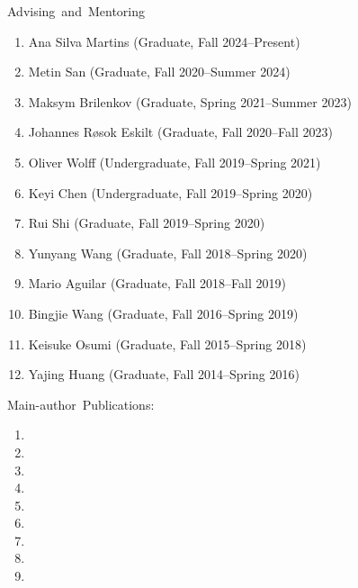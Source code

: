 \documentclass[a4paper]{resume}
\begin{document}
\begin{category}{\mbox{Advising and Mentoring}}
    \citemnobullet
    \noindent
    \begin{enumerate}[topsep=0pt,itemsep=0pt,partopsep=0pt,parsep=0pt]
        \item Ana Silva Martins (Graduate, Fall 2024--Present)
        \item Metin San (Graduate, Fall 2020--Summer 2024)
        \item Maksym Brilenkov (Graduate, Spring 2021--Summer 2023)
        \item Johannes Røsok Eskilt (Graduate, Fall 2020--Fall 2023)
	\item Oliver Wolff (Undergraduate, Fall 2019--Spring 2021)
        \item Keyi Chen (Undergraduate, Fall 2019--Spring 2020)
        \item Rui Shi (Graduate, Fall 2019--Spring 2020)
	\item Yunyang Wang (Graduate, Fall 2018--Spring 2020)
        \item Mario Aguilar (Graduate, Fall 2018--Fall 2019)
        \item Bingjie Wang (Graduate, Fall 2016--Spring 2019)
        \item Keisuke Osumi (Graduate, Fall 2015--Spring 2018)
        \item Yajing Huang (Graduate, Fall 2014--Spring 2016)
    \end{enumerate}
\end{category}


\begin{category}{\mbox{Main-author Publications:}}
\citemnobullet\\
%

\noindent
\begin{enumerate}[topsep=0pt,itemsep=0pt,partopsep=0pt,parsep=0pt]
\item {}
\item {}
\item {}
\item {}
\item {}
\item {}
\item {}
\item {}
\item {}
\end{enumerate}
\end{category}
\end{document}
